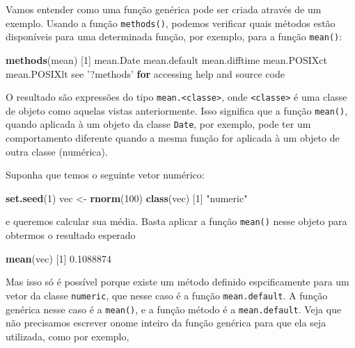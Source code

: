 \documentclass[10pt,a4paper]{book}
\newenvironment{Shaded}{\begin{snugshade}}{\end{snugshade}}
\newcommand{\KeywordTok}[1]{\textcolor[rgb]{0.13,0.29,0.53}{\textbf{#1}}}
\newcommand{\DecValTok}[1]{\textcolor[rgb]{0.00,0.00,0.81}{#1}}
\newcommand{\FloatTok}[1]{\textcolor[rgb]{0.00,0.00,0.81}{#1}}
\newcommand{\StringTok}[1]{\textcolor[rgb]{0.31,0.60,0.02}{#1}}
\newcommand{\ControlFlowTok}[1]{\textcolor[rgb]{0.13,0.29,0.53}{\textbf{#1}}}
\newcommand{\NormalTok}[1]{#1}
\begin{document}
Vamos entender como uma função genérica pode ser criada através de um
exemplo. Usando a função \texttt{methods()}, podemos verificar quais
métodos estão disponíveis para uma determinada função, por exemplo, para
a função \texttt{mean()}:

\begin{Shaded}
\begin{Highlighting}[]
\KeywordTok{methods}\NormalTok{(mean)}
\NormalTok{[}\DecValTok{1}\NormalTok{] mean.Date     mean.default  mean.difftime mean.POSIXct  mean.POSIXlt }
\NormalTok{see }\StringTok{'?methods'} \ControlFlowTok{for}\NormalTok{ accessing help and source code}
\end{Highlighting}
\end{Shaded}

O resultado são expressões do tipo
\texttt{mean.\textless{}classe\textgreater{}}, onde
\texttt{\textless{}classe\textgreater{}} é uma classe de objeto como
aquelas vistas anteriormente. Isso significa que a função
\texttt{mean()}, quando aplicada à um objeto da classe \texttt{Date},
por exemplo, pode ter um comportamento diferente quando a mesma função
for aplicada à um objeto de outra classe (numérica).

Suponha que temos o seguinte vetor numérico:

\begin{Shaded}
\begin{Highlighting}[]
\KeywordTok{set.seed}\NormalTok{(}\DecValTok{1}\NormalTok{)}
\NormalTok{vec <-}\StringTok{ }\KeywordTok{rnorm}\NormalTok{(}\DecValTok{100}\NormalTok{)}
\KeywordTok{class}\NormalTok{(vec)}
\NormalTok{[}\DecValTok{1}\NormalTok{] }\StringTok{"numeric"}
\end{Highlighting}
\end{Shaded}

e queremos calcular sua média. Basta aplicar a função \texttt{mean()}
nesse objeto para obtermos o resultado esperado

\begin{Shaded}
\begin{Highlighting}[]
\KeywordTok{mean}\NormalTok{(vec)}
\NormalTok{[}\DecValTok{1}\NormalTok{] }\FloatTok{0.1088874}
\end{Highlighting}
\end{Shaded}

Mas isso só é possível porque existe um método definido espcificamente
para um vetor da classe \texttt{numeric}, que nesse caso é a função
\texttt{mean.default}. A função genérica nesse caso é a \texttt{mean()},
e a função método é a \texttt{mean.default}. Veja que não precisamos
escrever onome inteiro da função genérica para que ela seja utilizada,
como por exemplo,
\end{document}
